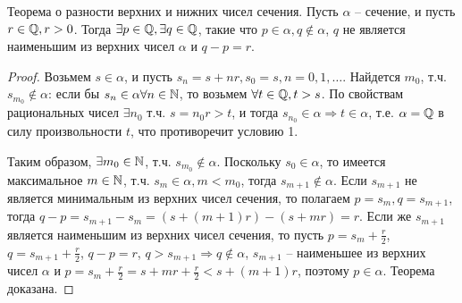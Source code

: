 \documentclass[main]{subfiles}
\begin{document}
\begin{theorem}
    Теорема о разности верхних и нижних чисел сечения. Пусть $\alpha$ -- сечение,
    и пусть $r \in \mathbb{Q}, r > 0$. Тогда $\exists p \in \mathbb{Q}, \exists q \in \mathbb{Q}$,
    такие что $p \in \alpha, q \notin \alpha$, $q$ не является наименьшим из
    верхних чисел $\alpha$ и $q - p = r$.
\end{theorem}
\begin{proof}
    Возьмем $s \in \alpha$, и пусть $s_n = s + nr, s_0 = s, n = 0, 1, \ldots$.
    Найдется $m_0$, т.ч. $s_{m_0} \notin \alpha$: если бы $s_n \in \alpha 
    \forall n \in \mathbb{N}$, то возьмем $\forall t \in \mathbb{Q}, t > s$. По свойствам
    рациональных чисел $\exists n_0$ т.ч. $s = n_0r > t$, и тогда 
    $s_{n_0} \in \alpha \Rightarrow t \in \alpha$, т.е. $\alpha = \mathbb{Q}$ в силу
    произвольности $t$, что противоречит условию 1.

    Таким образом, $\exists m_0 \in \mathbb{N}$, т.ч. $s_{m_0} \notin \alpha$.
    Поскольку $s_0 \in \alpha$, то имеется максимальное $m \in \mathbb{N}$, т.ч. 
    $s_m \in \alpha, m < m_0$, тогда $s_{m + 1} \notin \alpha$.
    Если $s_{m + 1}$ не является минимальным из верхних чисел сечения, 
    то полагаем $p = s_m, q = s_{m+1}$, тогда $q - p = s_{m + 1} - s_m = 
    (s + (m + 1)r) - (s + mr) = r$. Если же $s_{m + 1}$ является наименьшим
    из верхних чисел сечения, то пусть $p = s_m + \frac{r}{2}$,
    $q = s_{m + 1} + \frac{r}{2}$, $q - p = r$, $q > s_{m + 1} \Rightarrow
    q \notin \alpha$, $s_{m + 1}$ -- наименьшее из верхних чисел $\alpha$ и
    $p = s_m + \frac{r}{2} = s + mr + \frac{r}{2} < s + (m + 1)r$, поэтому
    $p \in \alpha$. Теорема доказана.  
\end{proof}
\end{document}
